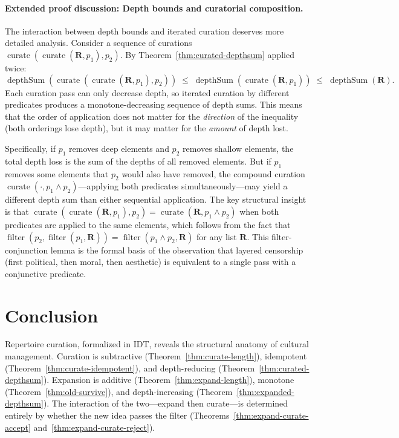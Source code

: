 \paragraph{Extended proof discussion: Depth bounds and curatorial
composition.}
The interaction between depth bounds and iterated curation
deserves more detailed analysis.  Consider a sequence of curations
$\operatorname{curate}(\operatorname{curate}(\mathbf{R}, p_1), p_2)$.
By Theorem~\ref{thm:curated-depthsum} applied twice:
\[
  \operatorname{depthSum}(\operatorname{curate}(
    \operatorname{curate}(\mathbf{R}, p_1), p_2))
  \;\le\;
  \operatorname{depthSum}(\operatorname{curate}(\mathbf{R}, p_1))
  \;\le\;
  \operatorname{depthSum}(\mathbf{R}).
\]
Each curation pass can only decrease depth, so iterated curation by
different predicates produces a monotone-decreasing sequence of depth
sums.  This means that the order of application does not matter for the
\emph{direction} of the inequality (both orderings lose depth), but it
may matter for the \emph{amount} of depth lost.

Specifically, if $p_1$ removes deep elements and $p_2$ removes shallow
elements, the total depth loss is the sum of the depths of all removed
elements.  But if $p_1$ removes some elements that $p_2$ would also have
removed, the compound curation $\operatorname{curate}(\cdot, p_1 \wedge
p_2)$---applying both predicates simultaneously---may yield a different
depth sum than either sequential application.  The key structural
insight is that $\operatorname{curate}(\operatorname{curate}(\mathbf{R},
p_1), p_2) = \operatorname{curate}(\mathbf{R}, p_1 \wedge p_2)$
when both predicates are applied to the same elements, which follows
from the fact that $\operatorname{filter}(p_2,
\operatorname{filter}(p_1, \mathbf{R})) =
\operatorname{filter}(p_1 \wedge p_2, \mathbf{R})$ for any list
$\mathbf{R}$.  This filter-conjunction lemma is the formal basis of the
observation that layered censorship (first political, then moral, then
aesthetic) is equivalent to a single pass with a conjunctive predicate.

\section{Conclusion}
\label{sec:ch15-conclusion}

Repertoire curation, formalized in IDT, reveals the structural anatomy of
cultural management.  Curation is subtractive
(Theorem~\ref{thm:curate-length}), idempotent
(Theorem~\ref{thm:curate-idempotent}), and depth-reducing
(Theorem~\ref{thm:curated-depthsum}).  Expansion is additive
(Theorem~\ref{thm:expand-length}), monotone
(Theorem~\ref{thm:old-survive}), and depth-increasing
(Theorem~\ref{thm:expanded-depthsum}).  The interaction of the two---expand
then curate---is determined entirely by whether the new idea passes the
filter (Theorems~\ref{thm:expand-curate-accept}
and~\ref{thm:expand-curate-reject}).

